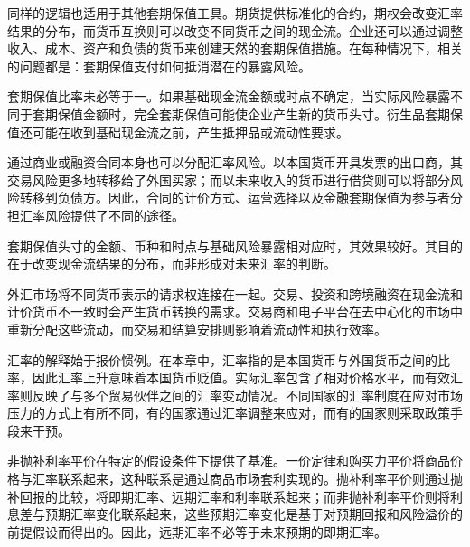 同样的逻辑也适用于其他套期保值工具。期货提供标准化的合约，期权会改变汇率结果的分布，而货币互换则可以改变不同货币之间的现金流。企业还可以通过调整收入、成本、资产和负债的货币来创建天然的套期保值措施。在每种情况下，相关的问题都是：套期保值支付如何抵消潜在的暴露风险。

套期保值比率未必等于一。如果基础现金流金额或时点不确定，当实际风险暴露不同于套期保值金额时，完全套期保值可能使企业产生新的货币头寸。衍生品套期保值还可能在收到基础现金流之前，产生抵押品或流动性要求。

通过商业或融资合同本身也可以分配汇率风险。以本国货币开具发票的出口商，其交易风险更多地转移给了外国买家；而以未来收入的货币进行借贷则可以将部分风险转移到负债方。因此，合同的计价方式、运营选择以及金融套期保值为参与者分担汇率风险提供了不同的途径。

\begin{tcolorbox}[
enhanced,
breakable,
colback=white,
colframe=FinanceBlue,
boxrule=0.7pt,
sharp corners,
borderline west={2.2pt}{0pt}{FinanceBlue},
title=\textbf{财务展望：应针对套期保值进行干预，而非对预测进行调整。},
coltitle=white,
colbacktitle=FinanceBlue,
fonttitle=\bfseries,
before skip=1.2em,
after skip=1.2em
]

套期保值头寸的金额、币种和时点与基础风险暴露相对应时，其效果较好。其目的在于改变现金流结果的分布，而非形成对未来汇率的判断。

\end{tcolorbox}




外汇市场将不同货币表示的请求权连接在一起。交易、投资和跨境融资在现金流和计价货币不一致时会产生货币转换的需求。交易商和电子平台在去中心化的市场中重新分配这些流动，而交易和结算安排则影响着流动性和执行效率。

汇率的解释始于报价惯例。在本章中，汇率指的是本国货币与外国货币之间的比率，因此汇率上升意味着本国货币贬值。实际汇率包含了相对价格水平，而有效汇率则反映了与多个贸易伙伴之间的汇率变动情况。不同国家的汇率制度在应对市场压力的方式上有所不同，有的国家通过汇率调整来应对，而有的国家则采取政策手段来干预。

非抛补利率平价在特定的假设条件下提供了基准。一价定律和购买力平价将商品价格与汇率联系起来，这种联系是通过商品市场套利实现的。抛补利率平价则通过抛补回报的比较，将即期汇率、远期汇率和利率联系起来；而非抛补利率平价则将利息差与预期汇率变化联系起来，这些预期汇率变化是基于对预期回报和风险溢价的前提假设而得出的。因此，远期汇率不必等于未来预期的即期汇率。

